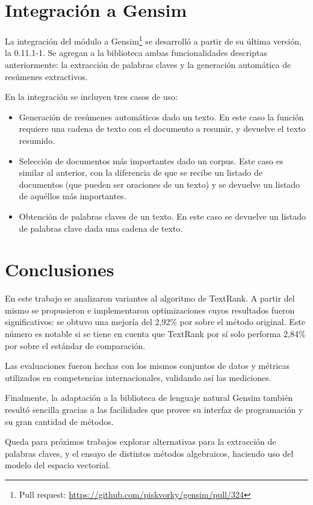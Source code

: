 \documentclass[a4paper]{article}
\begin{document}
\section{Integración a Gensim}
La integración del módulo a Gensim\footnote{Pull request: \url{https://github.com/piskvorky/gensim/pull/324}
} se desarrolló a partir de su última versión, la 0.11.1-1. Se agregan a la biblioteca ambas funcionalidades descriptas anteriormente: la extracción de palabras claves y la generación automática de resúmenes extractivos.

En la integración se incluyen tres casos de uso:
\begin{itemize}
\item Generación de resúmenes automáticos dado un texto. En este caso la función requiere una cadena de texto con el documento a resumir, y devuelve el texto resumido. 
\item Selección de documentos más importantes dado un corpus. Este caso es similar al anterior, con la diferencia de que se recibe un listado de documentos (que pueden ser oraciones de un texto) y se devuelve un listado de aquéllos más importantes.
\item Obtención de palabras claves de un texto. En este caso se devuelve un listado de palabras clave dada una cadena de texto.
\end{itemize}


\section{Conclusiones}
En este trabajo se analizaron variantes al algoritmo de TextRank. A partir del mismo se propusieron e implementaron optimizaciones cuyos resultados fueron significativos: se obtuvo una mejoría del 2,92\% por sobre el método original. Este número es notable si se tiene en cuenta que TextRank por sí solo performa 2,84\% por sobre el estándar de comparación.

Las evaluaciones fueron hechas con los mismos conjuntos de datos y métricas utilizados en competencias internacionales, validando así las mediciones.

Finalmente, la adaptación a la biblioteca de lenguaje natural Gensim también resultó sencilla gracias a las facilidades que provee su interfaz de programación y su gran cantidad de métodos.

Queda para próximos trabajos explorar alternativas para la extracción de palabras claves, y el ensayo de distintos métodos algebraicos, haciendo uso del modelo del espacio vectorial.
\end{document}
